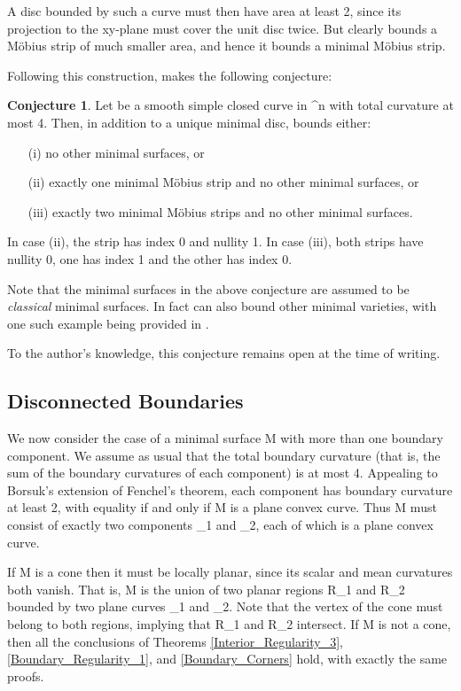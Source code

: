 \documentclass[a4paper, 11pt]{article}
\theoremstyle{plain}
\theoremstyle{definition}
\newtheorem*{conjecture}{Conjecture}
\theoremstyle{remark}
\numberwithin{equation}{subsection}
\def\({}
\def\){}
\def\pi{}
\begin{document}
A disc bounded by such a curve \(\Gamma\) must then have area at least \(2\pi\), since its projection to the \(xy\)-plane must cover the unit disc twice. But clearly \(\Gamma\) bounds a M{\"o}bius strip of much smaller area, and hence it bounds a minimal M{\"o}bius strip.

Following this construction, \cite{EWW02} makes the following conjecture:

\begin{conjecture}
Let \(\Gamma\) be a smooth simple closed curve in \(^{n}\) with total curvature at most \(4\pi\). Then, in addition to a unique minimal disc, \(\Gamma\) bounds either:
\begin{enumerate}
\item[(i)] no other minimal surfaces, or
\item[(ii)] exactly one minimal M{\"o}bius strip and no other minimal surfaces, or
\item[(iii)] exactly two minimal M{\"o}bius strips and no other minimal surfaces.
\end{enumerate}
In case (ii), the strip has index \(0\) and nullity \(1\). In case (iii), both strips have nullity \(0\), one has index \(1\) and the other has index \(0\).
\end{conjecture}

Note that the minimal surfaces in the above conjecture are assumed to be \emph{classical} minimal surfaces. In fact \(\Gamma\) can also bound other minimal varieties, with one such example being provided in \cite[Section 7]{EWW02}.

To the author's knowledge, this conjecture remains open at the time of writing.

\subsection{Disconnected Boundaries}

We now consider the case of a minimal surface \(M\) with more than one boundary component. We assume as usual that the total boundary curvature (that is, the sum of the boundary curvatures of each component) is at most \(4\pi\). Appealing to Borsuk's extension of Fenchel's theorem, each component has boundary curvature at least \(2\pi\), with equality if and only if \(\partial M\) is a plane convex curve. Thus \(\partial M\) must consist of exactly two components \(\Gamma_{1}\) and \(\Gamma_{2}\), each of which is a plane convex curve.

If \(M\) is a cone then it must be locally planar, since its scalar and mean curvatures both vanish. That is, \(M\) is the union of two planar regions \(R_{1}\) and \(R_{2}\) bounded by two plane curves \(\Gamma_{1}\) and \(\Gamma_{2}\). Note that the vertex of the cone must belong to both regions, implying that \(R_{1}\) and \(R_{2}\) intersect. If \(M\) is not a cone, then all the conclusions of Theorems \ref{Interior_Regularity_3}, \ref{Boundary_Regularity_1}, and \ref{Boundary_Corners} hold, with exactly the same proofs.
\end{document}
